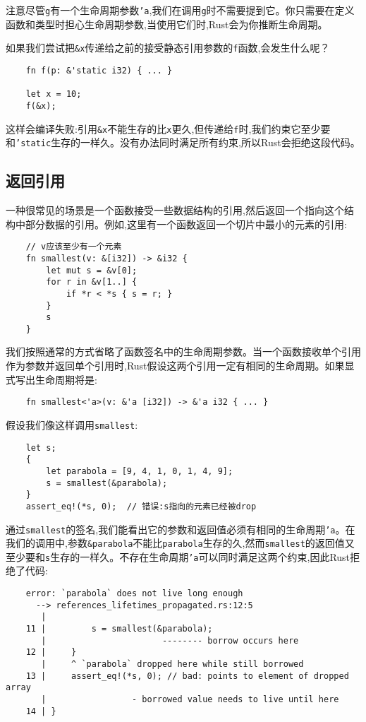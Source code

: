 注意尽管\texttt{g}有一个生命周期参数\texttt{'a},我们在调用\texttt{g}时不需要提到它。你只需要在定义函数和类型时担心生命周期参数,当使用它们时,Rust会为你推断生命周期。

如果我们尝试把\texttt{\&x}传递给之前的接受静态引用参数的\texttt{f}函数,会发生什么呢？
\begin{verbatim}
    fn f(p: &'static i32) { ... }

    let x = 10;
    f(&x);
\end{verbatim}

这样会编译失败:引用\texttt{\&x}不能生存的比\texttt{x}更久,但传递给\texttt{f}时,我们约束它至少要和\texttt{'static}生存的一样久。没有办法同时满足所有约束,所以Rust会拒绝这段代码。

\subsection{返回引用}
一种很常见的场景是一个函数接受一些数据结构的引用,然后返回一个指向这个结构中部分数据的引用。例如,这里有一个函数返回一个切片中最小的元素的引用:
\begin{verbatim}
    // v应该至少有一个元素
    fn smallest(v: &[i32]) -> &i32 {
        let mut s = &v[0];
        for r in &v[1..] {
            if *r < *s { s = r; }
        }
        s
    }
\end{verbatim}

我们按照通常的方式省略了函数签名中的生命周期参数。当一个函数接收单个引用作为参数并返回单个引用时,Rust假设这两个引用一定有相同的生命周期。如果显式写出生命周期将是:
\begin{verbatim}
    fn smallest<'a>(v: &'a [i32]) -> &'a i32 { ... }
\end{verbatim}

假设我们像这样调用\texttt{smallest}:
\begin{verbatim}
    let s;
    {
        let parabola = [9, 4, 1, 0, 1, 4, 9];
        s = smallest(&parabola);
    }
    assert_eq!(*s, 0);  // 错误:s指向的元素已经被drop
\end{verbatim}

通过\texttt{smallest}的签名,我们能看出它的参数和返回值必须有相同的生命周期\texttt{'a}。在我们的调用中,参数\texttt{\&parabola}不能比\texttt{parabola}生存的久,然而\texttt{smallest}的返回值又至少要和\texttt{s}生存的一样久。不存在生命周期\texttt{'a}可以同时满足这两个约束,因此Rust拒绝了代码:
\begin{verbatim}
    error: `parabola` does not live long enough
      --> references_lifetimes_propagated.rs:12:5
       |
    11 |         s = smallest(&parabola);
       |                       -------- borrow occurs here
    12 |     }
       |     ^ `parabola` dropped here while still borrowed
    13 |     assert_eq!(*s, 0); // bad: points to element of dropped array
       |                 - borrowed value needs to live until here
    14 | }
\end{verbatim}

